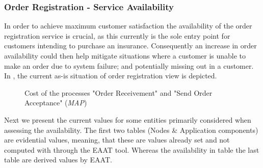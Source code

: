 \subsubsection{Order Registration - Service Availability}
\label{sec:order_availability}
In order to achieve maximum customer satisfaction the availability of the order registration service is crucial, as this currently is the sole entry point for customers intending to purchase an insurance. Consequently an increase in order availability could then help mitigate situations where a customer is unable to make an order due to system failure; and potentially missing out in a customer. In , the current as-is situation of order registration view is depicted.
\begin{center}
	\begin{figure}[H]
		\centering
		\setlength\fboxsep{7pt}
		\setlength\fboxrule{0.5pt}
		\caption{Cost of the processes "Order Receivement" and "Send Order Acceptance" (\emph{MAP})}
		\label{fig:map_order_availability}
	\end{figure}
\end{center}
Next we present the current values for some entities primarily considered when assessing the availability. The first two tables (Nodes \& Application components) are evidential values, meaning, that these are values already set and not computed with through the EAAT tool. Whereas the availability in table the last table are derived values by EAAT.


